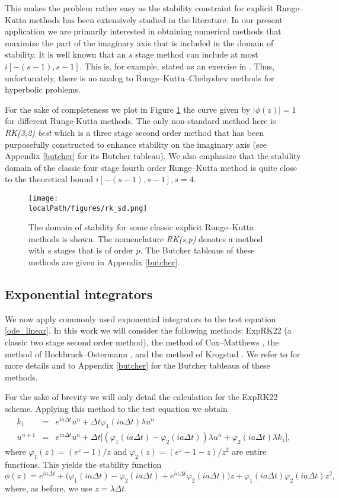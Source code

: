 This makes the problem rather easy as the stability constraint for explicit Runge--Kutta methods has been extensively studied in the literature. In our present application we are primarily interested in obtaining numerical methods that maximize the part of the imaginary axis that is included in the domain of stability. It is well known that an $s$ stage method can include at most $i [-(s-1),s-1]$. This is, for example, stated as an exercise in \cite[Chapter. IV.2, exercise 3]{sode}. Thus, unfortunately, there is no analog to Runge--Kutta--Chebyshev methods for hyperbolic problems.

For the sake of completeness we plot in Figure \ref{fig:RK_sd2} the curve given by $|\phi(z)| = 1$ for different Runge-Kutta methods. 
The only non-standard method here is \textit{RK(3,2) best} which is a three stage second order method that has been purposefully constructed to enhance stability on the imaginary axis (see Appendix \ref{butcher} for its Butcher tableau). We also emphasize that the stability domain of the classic four stage fourth order Runge--Kutta method is quite close to the theoretical bound $i [-(s-1),s-1], s=4$.

\begin{figure}[h]
	\centering
	\texttt{[image: \\localPath/figures/rk\_sd.png]}
    \caption{The domain of stability for some classic explicit Runge--Kutta methods is shown. The nomenclature \textit{RK(s,p)} denotes a method with $s$ stages that is of order $p$. The Butcher tableaus of these methods are given in Appendix \ref{butcher}.
    }
	\label{fig:RK_sd2}
\end{figure}


\subsection{Exponential integrators}

We now apply commonly used exponential integrators to the test equation \eqref{ode_linear}. In this work we will consider the following methods: ExpRK22 (a classic two stage second order method), the method of Cox--Matthews \cite{cox}, the method of Hochbruck--Ostermann  \cite{hochbruck2005}, and the method of Krogstad \cite{krogstad2005}. We refer to \cite{ei} for more details and to Appendix \ref{butcher} for the Butcher tableaus of these methods. 

For the sake of brevity we will only detail the calculation for the ExpRK22 scheme. Applying this method to the test equation we obtain
\begin{eqnarray*}
k_1&=&e^{ia\Delta t}u^n + \Delta t\varphi_1(ia\Delta t)\lambda u^n\nonumber\\
u^{n+1}&=& e^{ia\Delta t}u^n + \Delta t \Big[ (\varphi_1(ia\Delta t)-\varphi_2(ia\Delta t))\lambda u^n + \varphi_2(ia\Delta t)\lambda k_1\Big], 
\end{eqnarray*}
where $\varphi_1(z)=(e^{z}-1)/z$ and $\varphi_2(z)=(e^{z}-1-z)/z^2$ are entire functions. This yields the stability function
\[ \phi(z) = e^{ia\Delta t} + \Big(\varphi_1(ia\Delta t)-\varphi_2(ia\Delta t)+e^{ia\Delta t}\varphi_2(ia\Delta t)\Big)z + \varphi_1(ia\Delta t)\varphi_2(ia\Delta t)z^2, \]
where, as before, we use $z=\lambda \Delta t$.


